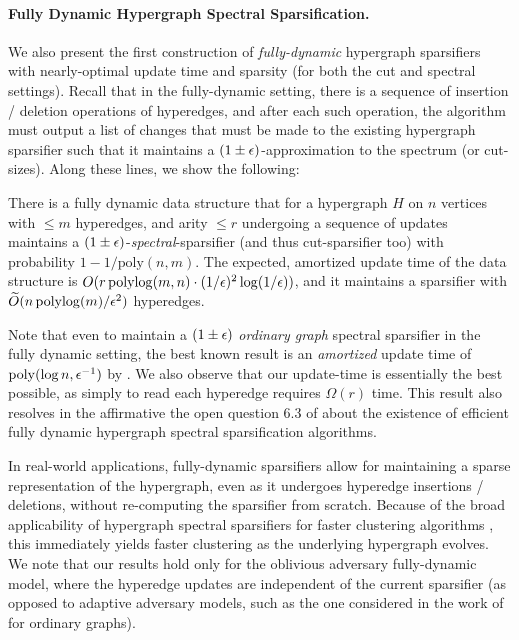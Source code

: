 \documentclass{article}
\begin{document}
\paragraph{Fully Dynamic Hypergraph Spectral Sparsification.} We also present the first construction of \emph{fully-dynamic} hypergraph sparsifiers with nearly-optimal update time and sparsity (for both the cut and spectral settings). Recall that in the fully-dynamic setting, there is a sequence of insertion / deletion operations of hyperedges, and after each such operation, the algorithm must output a list of changes that must be made to the existing hypergraph sparsifier such that it maintains a $(1 \pm \epsilon)$-approximation to the spectrum (or cut-sizes). Along these lines, we show the following:

\begin{theorem}\label{thm:fullyDynamicintro}
    There is a fully dynamic data structure that for a hypergraph $H$ on $n$ vertices with $\leq m$ hyperedges, and arity $\leq r$ undergoing a sequence of updates maintains a $(1 \pm \epsilon)$-\emph{spectral}-sparsifier (and thus cut-sparsifier too) with probability $1 - 1 / \mathrm{poly}(n,m)$. The expected, amortized update time of the data structure is $O(r\operatorname{polylog}(m,n) \cdot (1/\epsilon)^2\log(1/\epsilon))$, and it maintains a sparsifier with $\widetilde{O}(n \operatorname{polylog}(m) / \epsilon^2)$ hyperedges.
\end{theorem}

Note that even to maintain a $(1\pm\epsilon)$ \textit{ordinary graph} spectral sparsifier in the
fully dynamic setting, the best known result is an \textit{amortized} update time
of $\mathrm{poly}(\log n, \epsilon^{-1})$ by \cite{ADKKP16}. 
We also observe that our update-time is essentially the best possible, as simply to read each hyperedge requires $\Omega(r)$ time.
This result also resolves in the affirmative the open question 6.3
of \cite{STY24} about the existence of efficient fully dynamic hypergraph spectral sparsification algorithms.

In real-world applications, fully-dynamic sparsifiers allow for maintaining a sparse representation of the hypergraph, even as it undergoes hyperedge insertions / deletions, without re-computing the sparsifier from scratch. Because of the broad applicability of hypergraph spectral sparsifiers for faster clustering algorithms \cite{LM17, LM18, VBK20, VBK21,LVSLG21, ZLS22}, this immediately yields faster clustering as the underlying hypergraph evolves. We note that our results hold only for the oblivious adversary fully-dynamic model, where the hyperedge updates are independent of the current sparsifier (as opposed to adaptive adversary models, such as the one considered in the work of \cite{BBGNSS022} for ordinary graphs).
\end{document}
